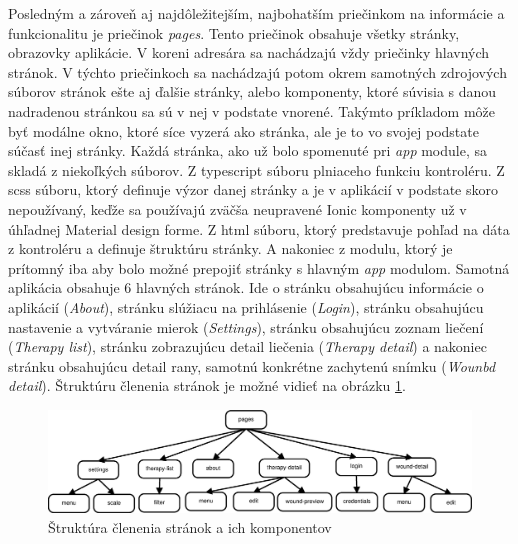 Posledným a zároveň aj najdôležitejším, najbohatším priečinkom na informácie a funkcionalitu je priečinok \textit{pages}. Tento priečinok obsahuje všetky stránky, obrazovky aplikácie. V koreni adresára sa nachádzajú vždy priečinky hlavných stránok. V týchto priečinkoch sa nachádzajú potom okrem samotných zdrojových súborov stránok ešte aj ďalšie stránky, alebo komponenty, ktoré súvisia s danou nadradenou stránkou sa sú v nej v podstate vnorené. Takýmto príkladom môže byť modálne okno, ktoré síce vyzerá ako stránka, ale je to vo svojej podstate súčasť inej stránky. Každá stránka, ako už bolo spomenuté pri \textit{app} module, sa skladá z niekoľkých súborov. Z typescript súboru plniaceho funkciu kontroléru. Z scss súboru, ktorý definuje výzor danej stránky a je v aplikácií v podstate skoro nepoužívaný, keďže sa používajú zväčša neupravené Ionic komponenty už v úhľadnej Material design forme. Z html súboru, ktorý predstavuje pohľad na dáta z kontroléru a definuje štruktúru stránky. A nakoniec z modulu, ktorý je prítomný iba aby bolo možné prepojiť stránky s hlavným \textit{app} modulom. Samotná aplikácia obsahuje 6 hlavných stránok. Ide o stránku obsahujúcu informácie o aplikácií (\textit{About}), stránku slúžiacu na prihlásenie (\textit{Login}), stránku obsahujúcu nastavenie a vytváranie mierok (\textit{Settings}), stránku obsahujúcu zoznam liečení (\textit{Therapy list}), stránku zobrazujúcu detail liečenia (\textit{Therapy detail}) a nakoniec stránku obsahujúcu detail rany, samotnú konkrétne zachytenú snímku (\textit{Wounbd detail}). Štruktúru členenia stránok je možné vidieť na obrázku \ref{fig:pages}.
\begin{figure}[h]
  \centering
  \includegraphics[scale=0.364]{fig/pages.eps}
  \caption{Štruktúra členenia stránok a ich komponentov}
  \label{fig:pages}
\end{figure}

